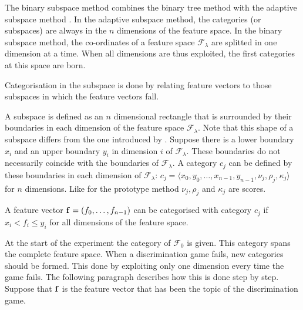 The binary subspace method combines the binary tree method with the adaptive subspace method \citep{dejongvogt:1998,dejong:2000}. In the adaptive subspace method, the categories (or subspaces) are always in the $n$ dimensions of the feature space. In the binary subspace method, the co-ordinates of a feature space ${\mathcal F}_\lambda$ are splitted in one dimension at a time. When all dimensions are thus exploited, the first categories at this space are born.

Categorisation in the subspace is done by relating feature vectors to those subspaces in which the feature vectors fall.


A subspace is defined as an $n$ dimensional rectangle that is surrounded by their boundaries in each dimension of the feature space ${\mathcal F}_\lambda$. Note that this shape of a subspace differs from the one introduced by \citep{oja:83}. Suppose there is a lower boundary $x_i$ and an upper boundary $y_i$ in dimension $i$ of ${\mathcal F}_\lambda$. These boundaries do not necessarily coincide with the boundaries of ${\mathcal F}_\lambda$. A category $c_j$ can be defined by these boundaries in each dimension of ${\mathcal F}_\lambda$: $c_j=\langle x_0,y_0,\ldots,x_{n-1},y_{n-1},\nu_j,\rho_j,\kappa_j \rangle$ for $n$ dimensions. Like for the prototype method $\nu_j,\rho_j$ and $\kappa_j$ are scores.

A feature vector ${\bf f}=(f_0,\ldots,f_{n-1})$ can be categorised with category $c_j$ if $x_i < f_i \leq y_i$ for all dimensions of the feature space.


At the start of the experiment the category of ${\mathcal F}_0$ is given. This category spans the complete feature space. When a discrimination game fails, new categories should be formed. This done by exploiting only one dimension every time the game fails. The following paragraph describes how this is done step by step. Suppose that ${\bf f}$ is the feature vector that has been the topic of the discrimination game.


